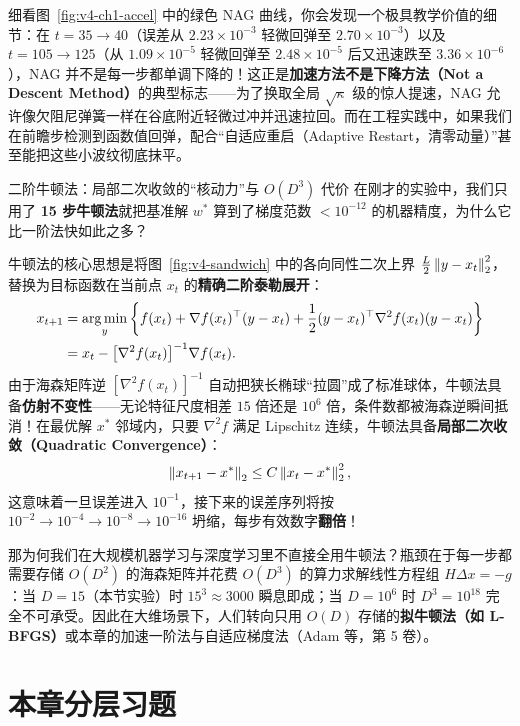 细看图~\ref{fig:v4-ch1-accel} 中的绿色 NAG 曲线，你会发现一个极具教学价值的细节：在 $t=35 \to 40$（误差从 $2.23\times 10^{-3}$ 轻微回弹至 $2.70\times 10^{-3}$）以及 $t=105 \to 125$（从 $1.09\times 10^{-5}$ 轻微回弹至 $2.48\times 10^{-5}$ 后又迅速跌至 $3.36\times 10^{-6}$），NAG 并不是每一步都单调下降的！这正是\textbf{加速方法不是下降方法（Not a Descent Method）}的典型标志——为了换取全局 $\sqrt{\kappa}$ 级的惊人提速，NAG 允许像欠阻尼弹簧一样在谷底附近轻微过冲并迅速拉回。而在工程实践中，如果我们在前瞻步检测到函数值回弹，配合“自适应重启（Adaptive Restart，清零动量）”甚至能把这些小波纹彻底抹平。

\begin{extBox}{二阶牛顿法：局部二次收敛的“核动力”与 $O(D^3)$ 代价}
在刚才的实验中，我们只用了 \textbf{15 步牛顿法}就把基准解 $w^*$ 算到了梯度范数 $< 10^{-12}$ 的机器精度，为什么它比一阶法快如此之多？

牛顿法的核心思想是将图~\ref{fig:v4-sandwich} 中的各向同性二次上界 $\frac{L}{2}\left\|y-x_t\right\|_2^2$，替换为目标函数在当前点 $x_t$ 的\textbf{精确二阶泰勒展开}：
\begin{align*}
  x_{t+1} &= \operatorname*{arg\,min}_y \left\{f(x_t) + \nabla f(x_t)^\top(y-x_t) + \frac{1}{2}(y-x_t)^\top \nabla^2 f(x_t)(y-x_t)\right\} \\
  &= x_t - \big[\nabla^2 f(x_t)\big]^{-1}\nabla f(x_t).
\end{align*}
由于海森矩阵逆 $[\nabla^2 f(x_t)]^{-1}$ 自动把狭长椭球“拉圆”成了标准球体，牛顿法具备\textbf{仿射不变性}——无论特征尺度相差 $15$ 倍还是 $10^6$ 倍，条件数都被海森逆瞬间抵消！在最优解 $x^*$ 邻域内，只要 $\nabla^2 f$ 满足 Lipschitz 连续，牛顿法具备\textbf{局部二次收敛（Quadratic Convergence）}：
\[
  \left\|x_{t+1} - x^*\right\|_2 \le C \left\|x_t - x^*\right\|_2^2,
\]
这意味着一旦误差进入 $10^{-1}$，接下来的误差序列将按 $10^{-2} \to 10^{-4} \to 10^{-8} \to 10^{-16}$ 坍缩，每步有效数字\textbf{翻倍}！

那为何我们在大规模机器学习与深度学习里不直接全用牛顿法？瓶颈在于每一步都需要存储 $O(D^2)$ 的海森矩阵并花费 $O(D^3)$ 的算力求解线性方程组 $H \Delta x = -g$：当 $D = 15$（本节实验）时 $15^3 \approx 3000$ 瞬息即成；当 $D = 10^6$ 时 $D^3 = 10^{18}$ 完全不可承受。因此在大维场景下，人们转向只用 $O(D)$ 存储的\textbf{拟牛顿法（如 L-BFGS）}或本章的加速一阶法与自适应梯度法（Adam 等，第 5 卷）。
\end{extBox}

\section*{本章分层习题}

